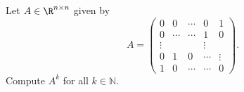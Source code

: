 \documentclass[11pt,nocut]{article}
\begin{document}
\begin{problem}[$\star$] Let $A \in \R^{n\times n}$ given by 
    $$
    A = \begin{pmatrix}
        0 & 0 & \cdots & 0 & 1 \\
        0 & \cdots & \cdots & 1& 0 \\
        \vdots & & & \vdots\\
        0 & 1 & 0& \cdots & \vdots \\
        1 & 0 & \cdots & \cdots & 0
    \end{pmatrix}.
    $$
    Compute $A^k$ for all $k \in \mathbb{N}$.
\end{problem}
\end{document}
